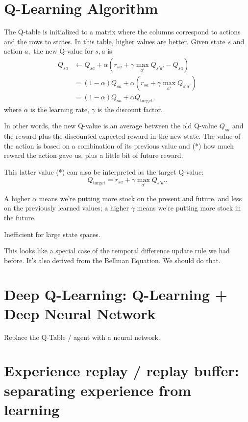 \documentclass[10pt]{article}
\theoremstyle{plain}
\theoremstyle{definition}
\theoremstyle{remark}
\newcommand{\0}{\varnothing}
\newcommand{\<}{\langle}
\renewcommand{\>}{\rangle}
\begin{document}
\section{Q-Learning Algorithm}

The Q-table is initialized to a matrix where the columns correspond to actions
and the rows to states. In this table, higher values are better. Given state \(
s \) and action \( a, \) the new Q-value for \( s,  a \) is
\begin{align*}
Q_{sa} &\gets Q_{sa} + \alpha (r_{sa} + \gamma \max_{a'} Q_{s'a'} - Q_{sa}) \\
&= (1 - \alpha) Q_{sa} + \alpha (r_{sa} + \gamma \max_{a'} Q_{s'a'}) \\
&= (1 - \alpha) Q_{sa} + \alpha Q_{\text{target}},
\end{align*}
where \( \alpha \) is the learning rate, \( \gamma \) is the discount factor.

In other words, the new Q-value is an average between the old Q-value \( Q_{sa}
\) and the reward plus the discounted expected reward in the new state. The
value of the action is based on a combination of its previous value and (*) how much
reward the action gave us, plus a little bit of future reward.

This latter value (*) can also be interpreted as the target Q-value:
$$
Q_{\text{target}} = r_{sa} + \gamma \max_{a'} Q_{s'a'}.
$$

A higher \(\alpha \) means we're
putting more stock on the present and future, and less on the previously learned
values; a higher \( \gamma \) means we're putting more stock in the future.

Inefficient for large state spaces.

This looks like a special case of the temporal difference update rule we had
before. It's also derived from the Bellman Equation. We should do that.

\section{Deep Q-Learning: Q-Learning + Deep Neural Network}

Replace the Q-Table / agent with a neural network.

\section{Experience replay / replay buffer: separating experience from learning}
\end{document}
